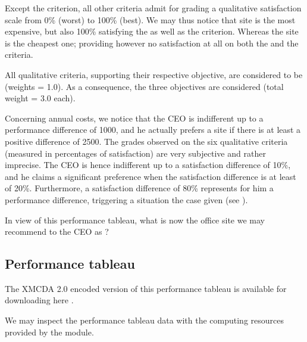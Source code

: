 \documentclass[a4paper,12pt,english]{sphinxhowto}
\begin{document}
Except the  criterion, all other criteria admit for grading a qualitative satisfaction scale from 0\% (worst) to 100\% (best). We may thus notice that site  is the most expensive, but also 100\% satisfying the  as well as the   criterion. Whereas the site  is the cheapest one; providing however no satisfaction at all on both the  and the  criteria.

All qualitative criteria, supporting their respective objective, are considered to be  (weights = 1.0). As a consequence, the three objectives are considered  (total weight = 3.0 each).

Concerning annual costs, we notice that the CEO is indifferent up to a performance difference of 1000\texteuro{}, and he actually prefers a site if there is at least a positive difference of 2500\texteuro{}. The grades observed on the six qualitative criteria (measured in percentages of satisfaction) are very subjective and rather imprecise. The CEO is hence indifferent up to a satisfaction difference of 10\%, and he claims a significant preference when the satisfaction difference is at least of 20\%.  Furthermore, a satisfaction difference of 80\% represents for him a  performance difference, triggering a  situation the case given (see ).

In view of this performance tableau, what is now the office site we may recommend to the CEO as  ?


\subsection{Performance tableau}
\label{\detokenize{tutorial:performance-tableau}}
The XMCDA 2.0 encoded version of this performance tableau is available for downloading here .
\begin{quote}
\end{quote}

We may inspect the performance tableau data with the computing resources provided by the  module.
\end{document}
